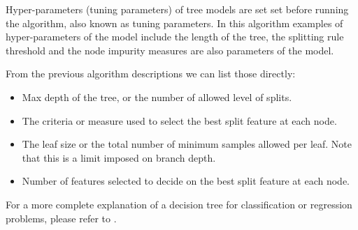 \documentclass{article}%
\theoremstyle{definition}
\begin{document}
Hyper-parameters (tuning parameters) of tree models are set set before running the algorithm, also known as tuning parameters. In this algorithm examples of hyper-parameters of the model include the length of the tree,  the splitting rule threshold and the node impurity measures are also parameters of the model. 

From the previous algorithm descriptions we can list those directly:

\begin{itemize}
	\item Max depth of the tree, or the number of allowed level of splits.
	\item The criteria or measure used to select the best split feature at each node.
	\item The leaf size or the total number of minimum samples allowed per leaf. Note that this is a limit imposed on  branch depth. 
	\item Number of features selected to decide on the best split feature at each node.
\end{itemize}





For a more complete explanation of a decision tree for classification or regression problems, please refer to \cite{breiman-cart84}.


\textit{}

\textit{}

\textit{}

\textit{}
\end{document}
